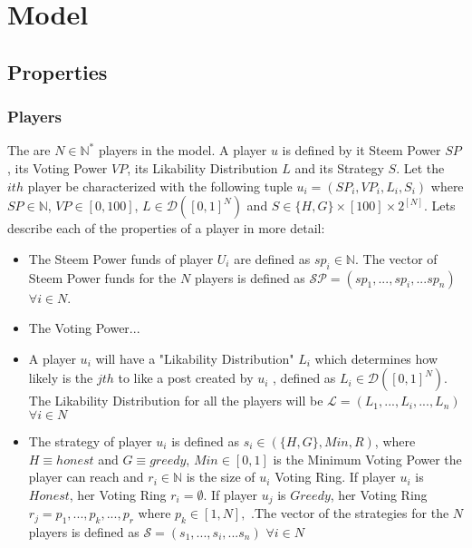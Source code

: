 \section{Model}
  \subsection{Properties}
    \subsubsection*{Players}
      The are $N \in \mathbb{N}^{*}$ players in the model. A player $u$ is
      defined by it Steem Power $SP$, its Voting Power $VP$, its Likability
      Distribution $L$ and its Strategy $S$. Let the $ith$ player be
      characterized with the following tuple $u_i = (SP_i,VP_i,L_i,S_i)$ where
      $SP \in \mathbb{N}$, $VP \in [0,100]$, $L \in
      \mathcal{D}\left([0,1]^N\right)$ and $S \in \lbrace H,G \rbrace \times
      [100] \times 2^{[N]}$. Lets describe each of the properties of a player in
      more detail:
      \begin{itemize}
        \item The Steem Power funds of player $U_i$ are defined as $sp_{i} \in
        \mathbb{N}$. The vector of Steem Power funds for the $N$ players is
        defined as $\mathcal{SP} = (sp_{1},...,sp_{i},...sp_{n})$ $\forall i \in
        N$.
        \item The Voting Power...
        \item A player $u_i$ will have a "Likability Distribution" $L_i$ which
        determines how likely is the $jth$ to like a post created by $u_i$ ,
        defined as $L_i \in \mathcal{D}\left([0,1]^N\right)$. The Likability
        Distribution for all the players will be $\mathcal{L} = ( L_1,...,
        L_i,..., L_n )$ $\forall i \in N$
        \item The strategy of player $u_i$ is defined as $s_i \in (\lbrace H,G
        \rbrace, Min, R )$, where $H \equiv honest$ and $G \equiv greedy$, $Min
        \in [0,1]$ is the Minimum Voting Power the player can reach and $r_i \in
        \mathbb{N}$ is the size of $u_i$ Voting Ring. If player $u_i$ is
        $Honest$, her Voting Ring $r_i = \emptyset$. If player $u_j$ is $Greedy$,
        her Voting Ring $r_j = {p_1,...,p_k,...,p_r}$ where $p_k \in [1,N], $
        .The vector of the strategies for the $N$ players is defined as
        $\mathcal{S} = (s_1,...,s_i,...s_n)$ $\forall i \in N$
      \end{itemize}

